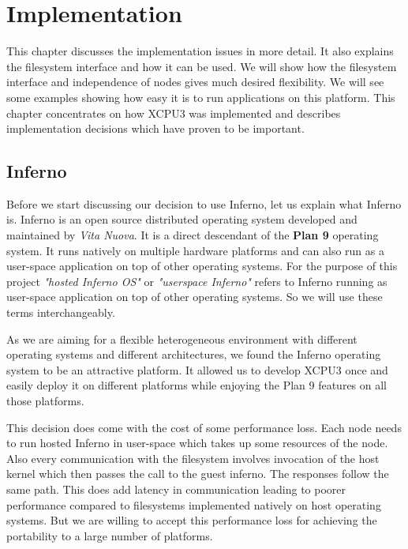 \chapter{Implementation}
\label{chap:implementation}

\ifpdf
    \graphicspath{{Chapter3/Chapter3Figs/PDF/}{Chapter3/Chapter3Figs/PNG/}
		{Chapter3/Chapter3Figs/}}
\else
    \graphicspath{{Chapter3/Chapter3Figs/EPS/}{Chapter3/Chapter3Figs/}}
\fi

This chapter discusses the implementation issues in more detail.  It also
explains the filesystem interface and how it can be used.  We will show how
the filesystem interface and independence of nodes gives much desired
flexibility.  We will see some examples showing how easy it is to run
applications on this platform. This chapter concentrates on how XCPU3 was
implemented and describes implementation decisions which have proven to be
important.


\section{Inferno}
Before we start discussing our decision to use Inferno, let us explain what
Inferno is.  Inferno\cite{inferno} is an open source distributed operating
system developed and maintained by \textit{Vita Nuova}.  It is a  direct descendant
of the \textbf{Plan 9} operating system.  It runs natively on multiple
hardware platforms and can also run as a user-space application on top of other
operating systems.  For the purpose of this project \textit{"hosted Inferno OS"} or
\textit{"userspace Inferno"} refers to Inferno running as user-space
application on top of other operating systems. So we will use these terms
interchangeably.

As we are aiming for a flexible heterogeneous environment with different
operating systems and different architectures, we found the Inferno operating
system to be an attractive platform.  It allowed us to develop XCPU3 once and
easily deploy it on different platforms while enjoying the Plan 9 features
on all those platforms.

This decision does come with the cost of some performance loss.  Each node needs
to run hosted Inferno in user-space which takes up some resources of the node. 
Also every communication with the filesystem involves invocation of the host
kernel which then passes the call to the guest inferno. The responses
follow the same path.  This does add latency in communication leading to
poorer performance compared to filesystems implemented natively on host
operating systems. But we are willing to accept this performance loss for achieving 
the portability to a large number of platforms.

